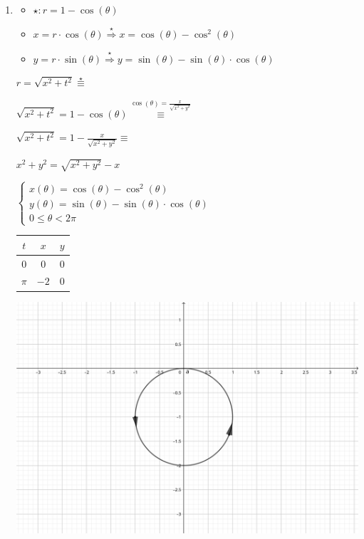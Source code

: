 \documentclass[../practica_02.tex]{subfiles}
\begin{document}
\begin{enumerate}
        \item 
            \begin{itemize}
                \item $\star: r=1-\cos(\theta)$
                \item $x= r\cdot\cos(\theta) \stackrel{\star}{\Rightarrow} x = \cos(\theta)-\cos^{2}(\theta)$
                \item $y= r\cdot\sin(\theta) \stackrel{\star}{\Rightarrow} y = \sin(\theta)-\sin(\theta)\cdot\cos(\theta)$
            \end{itemize}

            $ r = \sqrt{x^2 + t^2} \stackrel{\star}{\equiv}$

            $ \sqrt{x^2 + t^2} = 1 - \cos(\theta) \stackrel{\cos(\theta)= \frac{x}{\sqrt{x^2 + y^2}}}{\equiv} $

            $ \sqrt{x^2 + t^2} = 1 - \frac{x}{\sqrt{x^2 + y^2}} \equiv $

            $ x^2 + y^2 = \sqrt{x^2 + y^2} - x$

            \quad $\left\{
                \begin{array}{ll}
                    x(\theta) = \cos(\theta)-\cos^{2}(\theta)\\
                    y(\theta) = \sin(\theta)-\sin(\theta)\cdot\cos(\theta)\\
                    0 \leq \theta < 2\pi
                \end{array}
            \right.$

            \begin{tabular}{ c|c|c } 
                \hline
                    $t$                 & $x$  & $y$ \\
                \hline
                    $0$                 & $0 $ & $0 $ \\ 
                    $\pi$               & $-2 $ & $0 $ \\
                \hline
            \end{tabular}

            \includegraphics[scale=0.8]{ej04/resources/a.png} $ $
    \end{enumerate}
\end{document}
